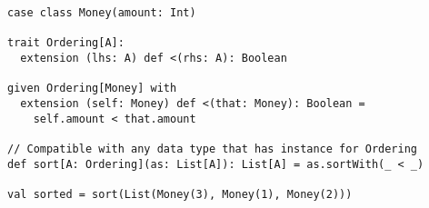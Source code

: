 \begin{algorithm}
\begin{verbatim}
case class Money(amount: Int)

trait Ordering[A]:
  extension (lhs: A) def <(rhs: A): Boolean

given Ordering[Money] with
  extension (self: Money) def <(that: Money): Boolean =
    self.amount < that.amount

// Compatible with any data type that has instance for Ordering
def sort[A: Ordering](as: List[A]): List[A] = as.sortWith(_ < _)

val sorted = sort(List(Money(3), Money(1), Money(2)))
\end{verbatim}

\caption{Definition, implementation and usage of the Ordering type class in Scala.%
\label{typeclass}}
\end{algorithm}